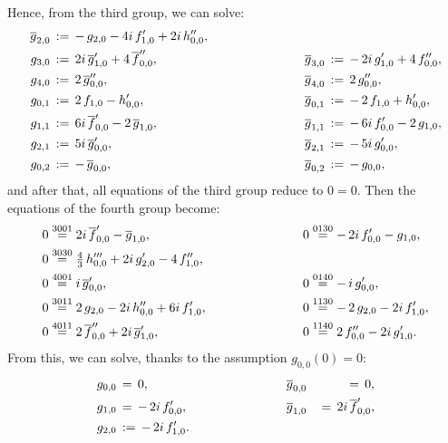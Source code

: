 \documentclass[12pt,twoside,leqno,openany]{amsart}
\begin{document}
Hence, from the third group, we can solve:
\[
\aligned
\overline{g}_{2,0}
&
\,:=\,
-\,g_{2,0}
-
4i\,f_{1,0}'
+
2i\,h_{0,0}'',
&
\ \ \ \ \ \ \ \ \ \ \ \ \ \ \ \ \ \ \ \
&
\\
g_{3,0}
&
\,:=\,
2i\,\overline{g}_{1,0}'
+
4\,\overline{f}_{0,0}'',
&
\ \ \ \ \ \ \ \ \ \ \ \ \ \ \ \ \ \ \ \
\overline{g}_{3,0}
&
\,:=\,
-\,2i\,g_{1,0}'
+
4\,f_{0,0}'',
\\
g_{4,0}
&
\,:=\,
2\,\overline{g}_{0,0}'',
&
\ \ \ \ \ \ \ \ \ \ \ \ \ \ \ \ \ \ \ \
\overline{g}_{4,0}
&
\,:=\,
2\,g_{0,0}'',
\\
g_{0,1}
&
\,:=\,
2\,f_{1,0}
-
h_{0,0}',
&
\ \ \ \ \ \ \ \ \ \ \ \ \ \ \ \ \ \ \ \
\overline{g}_{0,1}
&
\,:=\,
-\,2\,f_{1,0}
+
h_{0,0}',
\\
g_{1,1}
&
\,:=\,
6i\,\overline{f}_{0,0}'
-
2\,\overline{g}_{1,0},
&
\ \ \ \ \ \ \ \ \ \ \ \ \ \ \ \ \ \ \ \
\overline{g}_{1,1}
&
\,:=\,
-\,6i\,f_{0,0}'
-
2\,g_{1,0},
\\
g_{2,1}
&
\,:=\,
5i\,\overline{g}_{0,0}',
&
\ \ \ \ \ \ \ \ \ \ \ \ \ \ \ \ \ \ \ \
\overline{g}_{2,1}
&
\,:=\,
-\,5i\,g_{0,0}',
\\
g_{0,2}
&
\,:=\,
-\,\overline{g}_{0,0},
&
\ \ \ \ \ \ \ \ \ \ \ \ \ \ \ \ \ \ \ \
\overline{g}_{0,2}
&
\,:=\,
-\,g_{0,0},
\endaligned
\]
and after that, all equations of the third group reduce to $0 = 0$.
Then the equations of the fourth group become:
\[
\aligned
0
&
\overset{3001}{\,\,=\,\,}
2i\,\overline{f}_{0,0}'
-
\overline{g}_{1,0},
&
\ \ \ \ \ \ \ \ \ \ \ \ \ \ \ \ \ \ \ \
0
&
\overset{0130}{\,\,=\,\,}
-\,2i\,f_{0,0}'
-
g_{1,0},
\\
0
&
\overset{3030}{\,\,=\,\,}
\tfrac{4}{3}\,
h_{0,0}'''
+
2i\,g_{2,0}'
-
4\,f_{1,0}'',
&
\ \ \ \ \ \ \ \ \ \ \ \ \ \ \ \ \ \ \ \
&
\\
0
&
\overset{4001}{\,\,=\,\,}
i\,\overline{g}_{0,0}',
&
\ \ \ \ \ \ \ \ \ \ \ \ \ \ \ \ \ \ \ \
0
&
\overset{0140}{\,\,=\,\,}
-\,i\,g_{0,0}',
\\
0
&
\overset{3011}{\,\,=\,\,}
2\,g_{2,0}
-
2i\,h_{0,0}''
+
6i\,f_{1,0}',
&
\ \ \ \ \ \ \ \ \ \ \ \ \ \ \ \ \ \ \ \
0
&
\overset{1130}{\,\,=\,\,}
-\,2\,g_{2,0}
-
2i\,f_{1,0}',
\\
0
&
\overset{4011}{\,\,=\,\,}
2\,\overline{f}_{0,0}''
+
2i\,\overline{g}_{1,0}',
&
\ \ \ \ \ \ \ \ \ \ \ \ \ \ \ \ \ \ \ \
0
&
\overset{1140}{\,\,=\,\,}
2\,f_{0,0}''
-
2i\,g_{1,0}'.
\endaligned
\]
From this, we can solve, thanks to the assumption $g_{0,0}(0) = 0$:
\[
\aligned
g_{0,0}
&
\,=\,
0,
&
\ \ \ \ \ \ \ \ \ \ \ \ \ \ \ \ \ \ \ \
&
\overline{g}_{0,0}
&
\,=\,
0,
\\
g_{1,0}
&
\,=\,
-\,2i\,f_{0,0}',
&
\ \ \ \ \ \ \ \ \ \ \ \ \ \ \ \ \ \ \ \
&
\overline{g}_{1,0}
&
\,=\,
2i\,\overline{f}_{0,0}',
\\
g_{2,0}
&
\,:=\,
-\,2i\,f_{1,0}'.
\endaligned
\]
\end{document}

